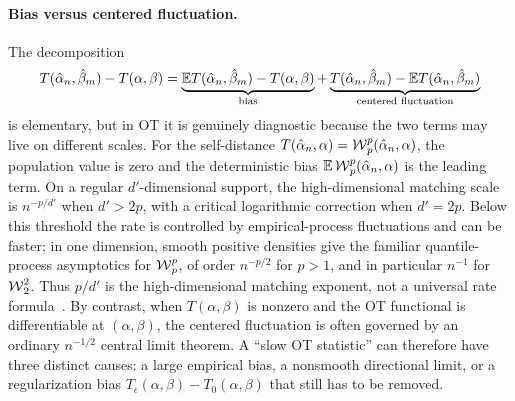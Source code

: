 \paragraph{Bias versus centered fluctuation.}
The decomposition
\[
	T(\hat\alpha_n,\hat\beta_m)-T(\alpha,\beta)
	=
	\underbrace{\mathbb{E} T(\hat\alpha_n,\hat\beta_m)-T(\alpha,\beta)}_{\text{bias}}
	+
	\underbrace{T(\hat\alpha_n,\hat\beta_m)-\mathbb{E} T(\hat\alpha_n,\hat\beta_m)}_{\text{centered fluctuation}}
\]
is elementary, but in OT it is genuinely diagnostic because the two terms may live on different scales.  For the self-distance \(T(\hat\alpha_n,\alpha)=\operatorname{\mathcal{W}}_p^p(\hat\alpha_n,\alpha)\), the population value is zero and the deterministic bias \(\mathbb{E}\operatorname{\mathcal{W}}_p^p(\hat\alpha_n,\alpha)\) is the leading term.  On a regular \(d'\)-dimensional support, the high-dimensional matching scale is \(n^{-p/d'}\) when \(d'>2p\), with a critical logarithmic correction when \(d'=2p\).  Below this threshold the rate is controlled by empirical-process fluctuations and can be faster; in one dimension, smooth positive densities give the familiar quantile-process asymptotics for \(\operatorname{\mathcal{W}}_p^p\), of order \(n^{-p/2}\) for \(p>1\), and in particular \(n^{-1}\) for \(\operatorname{\mathcal{W}}_2^2\).  Thus \(p/d'\) is the high-dimensional matching exponent, not a universal rate formula~\cite{dudley1969speed,fournier2015rate,weed2017sharp}.  By contrast, when \(T(\alpha,\beta)\) is nonzero and the OT functional is differentiable at \((\alpha,\beta)\), the centered fluctuation is often governed by an ordinary \(n^{-1/2}\) central limit theorem.  A ``slow OT statistic'' can therefore have three distinct causes: a large empirical bias, a nonsmooth directional limit, or a regularization bias \(T_\epsilon(\alpha,\beta)-T_0(\alpha,\beta)\) that still has to be removed.

